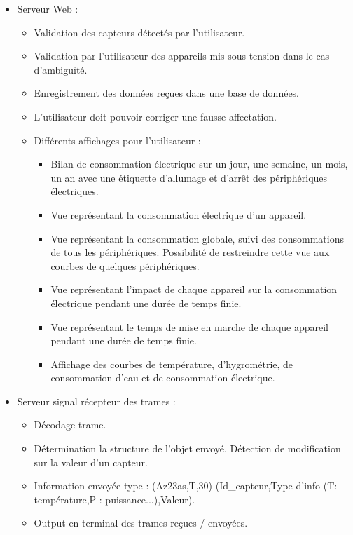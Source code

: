 \documentclass[10pt,a4paper]{article}
\begin{document}
\begin{itemize}
  \item Serveur Web :
  \begin{itemize}
    \item Validation des capteurs détectés par l'utilisateur.
    \item Validation par l'utilisateur des appareils mis sous tension dans le cas d'ambiguïté.
    \item Enregistrement des données reçues dans une base de données.
    \item L'utilisateur doit pouvoir corriger une fausse affectation.
    \item Différents affichages pour l'utilisateur :
    \begin{itemize}
      \item Bilan de consommation électrique sur un jour, une semaine, un mois, un an avec une étiquette d'allumage et d'arrêt des périphériques électriques.
      \item Vue représentant la consommation électrique d'un appareil.
      \item Vue représentant la consommation globale, suivi des consommations de tous les périphériques. Possibilité de restreindre cette vue aux courbes de quelques périphériques.
      \item Vue représentant l'impact de chaque appareil sur la consommation électrique pendant une durée de temps finie.
      \item Vue représentant le temps de mise en marche de chaque appareil pendant une durée de temps finie.
      \item Affichage des courbes de température, d'hygrométrie, de consommation d'eau et de consommation électrique.
    \end{itemize}
  \end{itemize}
\end{itemize}

\begin{itemize}
  \item Serveur signal récepteur des trames :
  \begin{itemize}
    \item Décodage trame.
    \item Détermination la structure de l'objet envoyé. Détection de modification sur la valeur d'un capteur.
    \item Information envoyée type : (Az23as,T,30) (Id\_capteur,Type d'info (T: température,P : puissance...),Valeur).
    \item Output en terminal des trames reçues / envoyées.
  \end{itemize}
\end{itemize}
\end{document}
